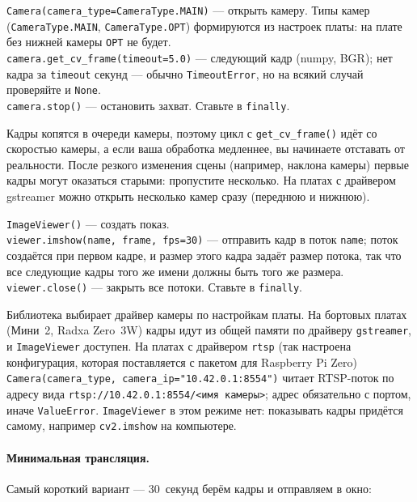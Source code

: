 \begin{codebox}[Camera]
\verb|Camera(camera_type=CameraType.MAIN)| --- открыть камеру. Типы камер (\verb|CameraType.MAIN|, \verb|CameraType.OPT|) формируются из настроек платы: на плате без нижней камеры \verb|OPT| не будет.\\
\verb|camera.get_cv_frame(timeout=5.0)| --- следующий кадр (numpy, BGR); нет кадра за \verb|timeout| секунд --- обычно \verb|TimeoutError|, но на всякий случай проверяйте и \verb|None|.\\
\verb|camera.stop()| --- остановить захват. Ставьте в \verb|finally|.
\end{codebox}

Кадры копятся в очереди камеры, поэтому цикл с \verb|get_cv_frame()| идёт со скоростью камеры, а если ваша обработка медленнее, вы начинаете отставать от реальности. После резкого изменения сцены (например, наклона камеры) первые кадры могут оказаться старыми: пропустите несколько. На платах с драйвером gstreamer можно открыть несколько камер сразу (переднюю и нижнюю).

\begin{codebox}[ImageViewer]
\verb|ImageViewer()| --- создать показ.\\
\verb|viewer.imshow(name, frame, fps=30)| --- отправить кадр в поток \verb|name|; поток создаётся при первом кадре, и размер этого кадра задаёт размер потока, так что все следующие кадры того же имени должны быть того же размера. \verb|viewer.close()| --- закрыть все потоки. Ставьте в \verb|finally|.
\end{codebox}

\begin{infobox}
Библиотека выбирает драйвер камеры по настройкам платы. На бортовых платах (Мини~2, Radxa Zero~3W) кадры идут из общей памяти по драйверу \texttt{gstreamer}, и \verb|ImageViewer| доступен. На платах с драйвером \texttt{rtsp} (так настроена конфигурация, которая поставляется с пакетом для Raspberry Pi Zero) \verb|Camera(camera_type, camera_ip="10.42.0.1:8554")| читает RTSP-поток по адресу вида \texttt{rtsp://10.42.0.1:8554/<имя камеры>}; адрес обязательно с портом, иначе \verb|ValueError|. \verb|ImageViewer| в этом режиме нет: показывать кадры придётся самому, например \verb|cv2.imshow| на компьютере.
\end{infobox}

\paragraph{Минимальная трансляция.} Самый короткий вариант --- 30~секунд берём кадры и отправляем в окно:

